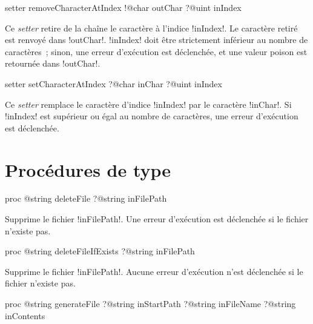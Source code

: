\begin{galgasbox}
setter removeCharacterAtIndex
   !@char outChar
   ?@uint inIndex
\end{galgasbox}


Ce \emph{setter} retire de la chaîne le caractère à l'indice \ggs!inIndex!. Le caractère retiré est renvoyé dans \ggs!outChar!. \ggs!inIndex! doit être strictement inférieur au nombre de caractères~; sinon, une erreur d'exécution est déclenchée, et une valeur poison est retournée dans \ggs!outChar!. 







\begin{galgasbox}
setter setCharacterAtIndex
   ?@char inChar
   ?@uint inIndex
\end{galgasbox}


Ce \emph{setter} remplace le caractère d'indice \ggs!inIndex! par le caractère \ggs!inChar!. Si \ggs!inIndex! est supérieur ou égal au nombre de caractères, une erreur d'exécution est déclenchée. 




\section{Procédures de type}




\begin{galgasbox}
proc @string deleteFile ?@string inFilePath
\end{galgasbox}

Supprime le fichier \ggs!inFilePath!. Une erreur d'exécution est déclenchée si le fichier n'existe pas.






\begin{galgasbox}
proc @string deleteFileIfExists ?@string inFilePath
\end{galgasbox}

Supprime le fichier \ggs!inFilePath!. Aucune erreur d'exécution n'est déclenchée si le fichier n'existe pas.








\begin{galgasbox}
proc @string generateFile
   ?@string inStartPath
   ?@string inFileName
   ?@string inContents
\end{galgasbox}

